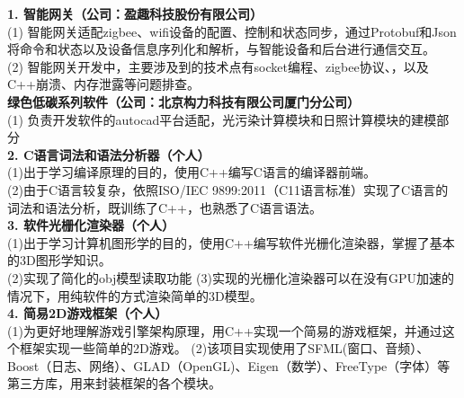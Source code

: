 \documentclass{resume} %
\begin{document}
\begin{rSection}{}
\textbf{1.	智能网关（公司：盈趣科技股份有限公司）}\\
(1) 智能网关适配zigbee、wifi设备的配置、控制和状态同步，通过Protobuf和Json将命令和状态以及设备信息序列化和解析，与智能设备和后台进行通信交互。 \\
(2) 智能网关开发中，主要涉及到的技术点有socket编程、zigbee协议、，以及C++崩溃、内存泄露等问题排查。 \\
\textbf{绿色低碳系列软件（公司：北京构力科技有限公司厦门分公司）}\\
(1) 负责开发软件的autocad平台适配，光污染计算模块和日照计算模块的建模部分\\
\textbf{2.  C语言词法和语法分析器（个人）}\\
(1)出于学习编译原理的目的，使用C++编写C语言的编译器前端。\\
(2)由于C语言较复杂，依照ISO/IEC 9899:2011（C11语言标准）实现了C语言的词法和语法分析，既训练了C++，也熟悉了C语言语法。 \\
\textbf{3.  软件光栅化渲染器（个人）}\\
(1)出于学习计算机图形学的目的，使用C++编写软件光栅化渲染器，掌握了基本的3D图形学知识。\\
(2)实现了简化的obj模型读取功能
(3)实现的光栅化渲染器可以在没有GPU加速的情况下，用纯软件的方式渲染简单的3D模型。\\
\textbf{4.	简易2D游戏框架（个人）}\\
(1)为更好地理解游戏引擎架构原理，用C++实现一个简易的游戏框架，并通过这个框架实现一些简单的2D游戏。
(2)该项目实现使用了SFML(窗口、音频）、Boost（日志、网络）、GLAD（OpenGL)、Eigen（数学）、FreeType（字体）等第三方库，用来封装框架的各个模块。\\



\end{rSection}

\end{document}
